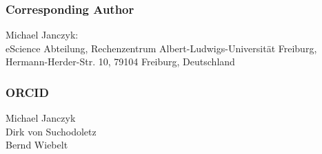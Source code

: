 \documentclass[
  paper       = a4,
  headheight  = 16pt,
  footheight  = 16pt,
  fontsize    = 10pt,
  twoside     = true,
  titlepage   = true,
]{scrartcl}
\begin{document}

\subsubsection*{Corresponding Author}
\label{sec:cauthor}

Michael Janczyk:~\\
eScience Abteilung, Rechenzentrum Albert-Ludwigs-Universität Freiburg,\\
Hermann-Herder-Str. 10, 79104 Freiburg, Deutschland

\subsubsection*{ORCID} %

Michael Janczyk\,\\
Dirk von Suchodoletz\,\\
Bernd Wiebelt\,


\printbibliography
\end{document}
